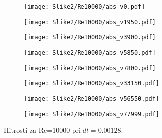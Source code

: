 \documentclass[12pt,a4paper]{article}
\begin{document}
\begin{figure}[H]
    \centering
    \begin{subfigure}[b]{0.2\textwidth}  			
        \texttt{[image: Slike2/Re10000/abs\_v0.pdf]}
    \end{subfigure}
    \begin{subfigure}[b]{0.2\textwidth}  			
        \texttt{[image: Slike2/Re10000/abs\_v1950.pdf]}
    \end{subfigure}
    \begin{subfigure}[b]{0.2\textwidth}  			
        \texttt{[image: Slike2/Re10000/abs\_v3900.pdf]}
    \end{subfigure}
        \begin{subfigure}[b]{0.2\textwidth}  			
        \texttt{[image: Slike2/Re10000/abs\_v5850.pdf]}
    \end{subfigure}
 
     \begin{subfigure}[b]{0.2\textwidth}  			
        \texttt{[image: Slike2/Re10000/abs\_v7800.pdf]}
    \end{subfigure}
        \begin{subfigure}[b]{0.2\textwidth}  			
        \texttt{[image: Slike2/Re10000/abs\_v33150.pdf]}
    \end{subfigure}
        \begin{subfigure}[b]{0.2\textwidth}  			
        \texttt{[image: Slike2/Re10000/abs\_v56550.pdf]}
    \end{subfigure}
        \begin{subfigure}[b]{0.2\textwidth}  			
        \texttt{[image: Slike2/Re10000/abs\_v77999.pdf]}
    \end{subfigure}
    \caption{Hitrosti za Re=10000 pri $dt=0.00128$.} \label{fig:slika7}
\end{figure}
\end{document}
